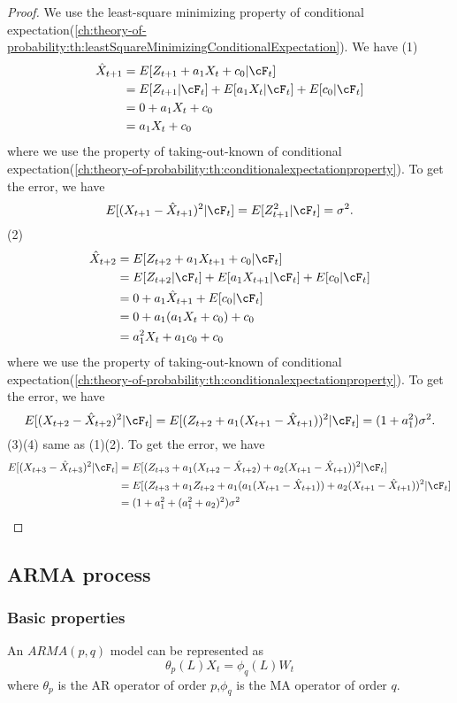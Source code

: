 \begin{proof}
	We use the least-square minimizing property of conditional expectation(\autoref{ch:theory-of-probability:th:leastSquareMinimizingConditionalExpectation}). We have	
	(1) 
	\begin{align*}
	\hat{X}_{t+1} &= E[Z_{t+1} + a_1 X_{t} + c_0|\cF_t] \\
	&= E[Z_{t+1}|\cF_t] + E[a_1 X_{t}|\cF_t] + E[c_0|\cF_t] \\
	&=0 + a_1 X_{t} + c_0 \\
	&=a_1 X_{t} + c_0
	\end{align*}
	where we use the property of taking-out-known of conditional expectation(\autoref{ch:theory-of-probability:th:conditionalexpectationproperty}).
	To get the error, we have
	$$E[(X_{t+1} - \hat{X}_{t+1})^2|\cF_t] = E[Z_{t+1}^2|\cF_t] = \sigma^2.$$
	(2) 
	\begin{align*}
	\hat{X}_{t+2} &= E[Z_{t+2} + a_1 X_{t+1} + c_0|\cF_t] \\
	&= E[Z_{t+2}|\cF_t] + E[a_1 X_{t+1}|\cF_t] + E[c_0|\cF_t] \\
	&= 0 + a_1\hat{X}_{t+1} + E[c_0|\cF_t] \\
	&=0 + a_1(a_1X_t + c_0) + c_0 \\
	&= a_1^2 X_t + a_1c_0 + c_0
	\end{align*}
	where we use the property of taking-out-known of conditional expectation(\autoref{ch:theory-of-probability:th:conditionalexpectationproperty}).
	To get the error, we have
	$$E[(X_{t+2} - \hat{X}_{t+2})^2|\cF_t] = E[(Z_{t+2} + a_1(X_{t+1} - \hat{X}_{t+1}))^2|\cF_t] = (1 + a^2_1)\sigma^2.$$
	(3)(4) same as (1)(2). 
	To get the error, we have
\begin{align*}
E[(X_{t+3} - \hat{X}_{t+3})^2|\cF_t] &= E[(Z_{t+3} + a_1(X_{t+2} - \hat{X}_{t+2}) + a_2 (X_{t+1} - \hat{X}_{t+1}))^2|\cF_t] \\
&= E[(Z_{t+3} + a_1 Z_{t+2} + a_1(a_1(X_{t+1} - \hat{X}_{t+1})) + a_2 (X_{t+1} - \hat{X}_{t+1}))^2|\cF_t] \\
&= (1 + a_1^2 + (a_1^2 + a_2)^2 )\sigma^2 
\end{align*}	
\end{proof}

\subsection{ARMA process}
\subsubsection{Basic properties}
\begin{definition}
An $ARMA(p,q)$ model can be represented as
$$\theta_p(L) X_t = \phi_q(L)W_t$$
where $\theta_p$ is the AR operator of order $p$,$\phi_q$ is the MA operator of order $q$.
\end{definition}


